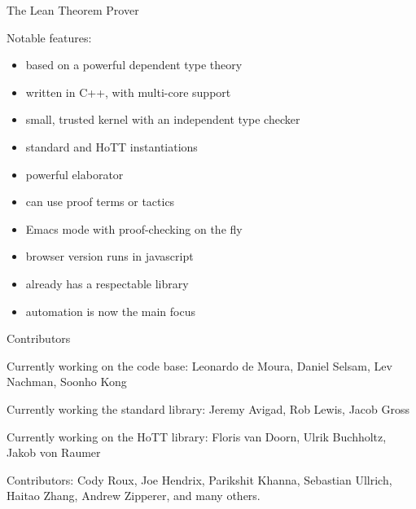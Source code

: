 \documentclass[xcolor=table]{beamer}
\begin{document}

\begin{frame}{The Lean Theorem Prover}

Notable features:
\begin{itemize}
 \item based on a powerful dependent type theory
 \item written in C++, with multi-core support
 \item small, trusted kernel with an independent type checker
 \item standard and HoTT instantiations
 \item powerful elaborator
 \item can use proof terms or tactics
 \item Emacs mode with proof-checking on the fly
 \item browser version runs in javascript
 \item already has a respectable library
 \item automation is now the main focus
\end{itemize}

\end{frame}

\begin{frame}{Contributors}

Currently working on the code base: Leonardo de Moura, Daniel Selsam, Lev Nachman, Soonho Kong

\bigskip

Currently working the standard library: Jeremy Avigad, Rob Lewis, Jacob Gross

\bigskip

Currently working on the HoTT library: Floris van Doorn, Ulrik Buchholtz, Jakob von Raumer

\bigskip

Contributors: Cody Roux, Joe Hendrix, Parikshit Khanna, Sebastian Ullrich, Haitao Zhang, Andrew Zipperer, and many others.


\end{frame}
\end{document}
